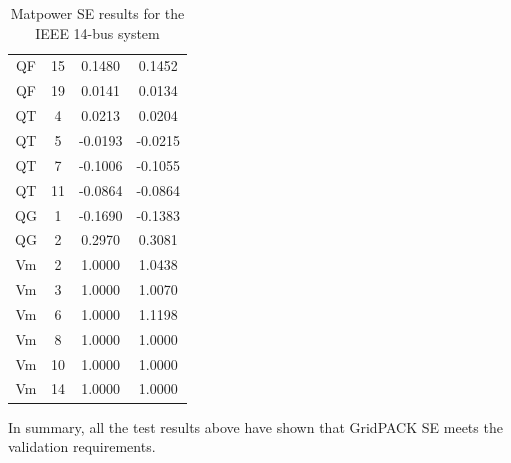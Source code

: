 \documentclass[a4paper]{article}
\begin{document}
\begin{table} [ht]
\begin{tabular} {c|c|c|c}
      QF    &     15   &       0.1480   &      0.1452 \\
      QF    &     19   &       0.0141   &      0.0134 \\
      QT    &      4   &       0.0213   &      0.0204 \\
      QT    &      5   &      -0.0193   &     -0.0215 \\
      QT    &      7   &      -0.1006   &     -0.1055 \\
      QT    &     11   &      -0.0864   &     -0.0864 \\
      QG   &       1   &      -0.1690   &     -0.1383 \\
      QG   &       2   &       0.2970   &      0.3081 \\
      Vm   &       2   &       1.0000   &      1.0438 \\
      Vm   &       3   &       1.0000   &      1.0070 \\
      Vm   &       6   &       1.0000   &      1.1198 \\
      Vm   &       8   &       1.0000   &      1.0000 \\
      Vm   &      10   &       1.0000   &      1.0000 \\
      Vm   &      14   &       1.0000   &      1.0000 \\
\hline
\end{tabular}
\caption{Matpower SE results for the IEEE 14-bus system} \label{tab:MatpowerSE} 
\end{table}

\bigskip
In summary, all the test results above have shown that GridPACK SE meets the validation requirements.
\end{document}
